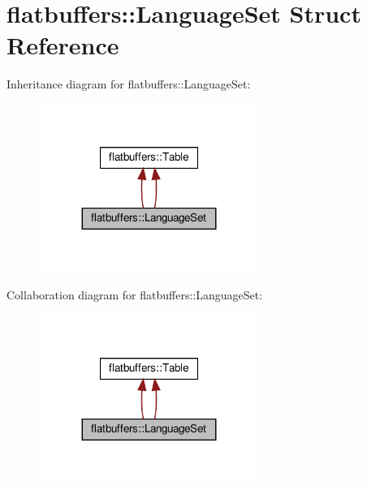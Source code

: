 \hypertarget{structflatbuffers_1_1LanguageSet}{}\section{flatbuffers\+:\+:Language\+Set Struct Reference}
\label{structflatbuffers_1_1LanguageSet}


Inheritance diagram for flatbuffers\+:\+:Language\+Set\+:
\nopagebreak
\begin{figure}[H]
\begin{center}
\leavevmode
\includegraphics[width=203pt]{structflatbuffers_1_1LanguageSet__inherit__graph}
\end{center}
\end{figure}


Collaboration diagram for flatbuffers\+:\+:Language\+Set\+:
\nopagebreak
\begin{figure}[H]
\begin{center}
\leavevmode
\includegraphics[width=203pt]{structflatbuffers_1_1LanguageSet__coll__graph}
\end{center}
\end{figure}
